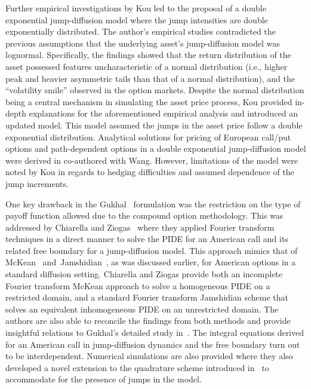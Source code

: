 Further empirical investigations by Kou \cite{Kou2002} led to the proposal of a double exponential jump-diffusion model where the jump intensities are double exponentially distributed. The author's empirical studies contradicted the previous assumptions that the underlying asset's jump-diffusion model was lognormal. Specifically, the findings showed that the return distribution of the asset possessed features uncharacteristic of a normal distribution (i.e., higher peak and heavier asymmetric tails than that of a normal distribution), and the ``volatility smile'' observed in the option markets. Despite the normal distribution being a central mechanism in simulating the asset price process, Kou provided in-depth explanations for the aforementioned empirical analysis and introduced an updated model. This model assumed the jumps in the asset price follow a double exponential distribution. Analytical solutions for pricing of European call/put options and path-dependent options in a double exponential jump-diffusion model were derived in \cite{Kou2004} co-authored with Wang. However, limitations of the model were noted by Kou \cite{Kou2002} in regards to hedging difficulties and assumed dependence of the jump increments.

One key drawback in the Gukhal~\cite{Gukhal2001} formulation was the restriction on the type of payoff function allowed due to the compound option methodology. This was addressed by Chiarella and Ziogas~\cite{Chiarella2006} where they applied Fourier transform techniques in a direct manner to solve the PIDE for an American call and its related free boundary for a jump-diffusion model. This approach mimics that of McKean~\cite{McKean1965} and~Jamshidian~\cite{Jamshidian1992}, as was discussed earlier, for American options in a standard diffusion setting. Chiarella and Ziogas provide both an incomplete Fourier transform McKean approach to solve a homogeneous PIDE on a restricted domain, and a standard Fourier transform Jamshidian scheme that solves an equivalent inhomogeneous PIDE on an unrestricted domain. The authors are also able to reconcile the findings from both methods and provide insightful relations to Gukhal's detailed study in~\cite{Gukhal2001}. 
The integral equations derived for an American call in jump-diffusion dynamics and the free boundary turn out to be interdependent. Numerical simulations are also provided where they also developed a novel extension to the quadrature scheme introduced in~\cite{Kallast2003} to accommodate for the presence of jumps in the model.

